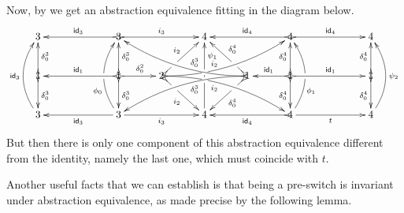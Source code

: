 \begin{example}
	Now, by  we get an abstraction equivalence fitting in the diagram below.
	\[\xymatrix@C=30pt@R=25pt{3 && \ar@{>->}[ll]_{\id{3}} 3 \ar@{>->}[rr]^{i_3}&& 4 && \ar@{>->}[ll]_{\id{4}} 4 \ar@{>->}[rr]^{\id{4}}&& 4\\1 \ar@{>->}[d]^{\delta^3_0} \ar@{>->}[u]_{\delta^3_0}&& 1 \ar@{>->}[d]^{\delta^3_0} \ar@{>->}[u]_{\delta^3_0}\ar@{>->}[ll]_{\id{1}} \ar@{>->}[r]^{\delta^2_0} & 2 \ar@{>->}@/^.35cm/[drrr]|(.315)\hole_(.4){i_2} \ar@{>->}[dr]|(.3)\hole_{i_2} \ar@{>->}@/_.35cm/[urrr]|(.315)\hole^(.4){i_2} \ar@{>->}[ur]|(.3)\hole^{i_2}& &1 \ar@{>->}@/_.35cm/[dlll]^(.4){\delta^3_0} \ar@{>->}[dl]|(.3)\hole^{\delta^4_0} \ar@{>->}@/^.35cm/[ulll]_(.4){\delta^3_0} \ar@{>->}[ul]|(.3)\hole_{\delta^4_0}& 1 \ar@{>->}[d]_{\delta^4_0} \ar@{>->}[u]^{\delta^4_0}\ar@{>->}[l]_{\id{1}} \ar@{>->}[rr]^{\id{1}} && 1 \ar@{>->}[d]_{\delta^4_0} \ar@{>->}[u]^{\delta^4_0}\\ \ar@/^.5cm/[uu]^{\id{3}} 3 && \ar[ll]^{\id{3}} 3 \ar@{>}@/^.5cm/[uu]^(.33){\phi_0}|\hole \ar[rr]_{i_3}&& 4 \ar@{>}[uu]_(.76){\psi_1}|(.45)\hole |(.55)\hole&& \ar@{>->}[ll]^{\id{4}} 4 \ar@{>}@/_.5cm/[uu]_(.33){\phi_1}|\hole\ar[rr]_{t}&& 4\ar@{>}@/_.5cm/[uu]_{\psi_2}}\]
	But then there is only one component of this abstraction equivalence different from the identity, namely the last one, which must coincide with $t$.
\end{example}


Another useful facts that we can establish is that being a pre-switch is invariant under abstraction equivalence, as made precise by the following lemma.

